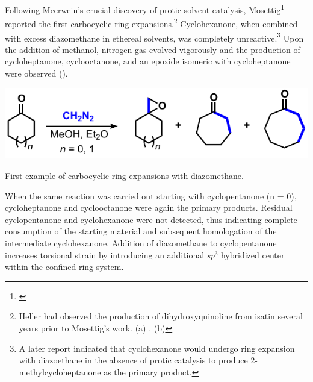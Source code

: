 Following Meerwein's crucial discovery of protic solvent catalysis,
Mosettig\footnote{ \label{ref:mosettig}} reported the first carbocyclic ring expansions.\footnote{Heller had observed the production of dihydroxyquinoline
from isatin several years prior to Mosettig's work. (a) . (b)
} Cyclohexanone, when combined with excess
diazomethane in ethereal solvents, was completely unreactive.\footnote{A later
report indicated that cyclohexanone would undergo ring expansion with
diazoethane in the absence of protic catalysis to produce 2-methylcycloheptanone
as the primary product. } Upon the addition of methanol, nitrogen
gas evolved vigorously and the production of cycloheptanone, cyclooctanone, and an epoxide
isomeric with cycloheptanone were observed ().
\begin{Scheme}[b]
  \centering
  \includegraphics[scale=0.8]{chp_diazobkg/images/mosettig}
  \caption{First example of carbocyclic ring expansions with diazomethane.}
  \label{sch:mosettig}
\end{Scheme}
When the same reaction was carried out starting with cyclopentanone (n = 0),
cycloheptanone and cyclooctanone were again the primary products. Residual cyclopentanone and cyclohexanone were not detected, thus indicating
complete consumption of the starting material and subsequent homologation of the
intermediate cyclohexanone. Addition of diazomethane to cyclopentanone increases torsional strain by
introducing an additional \textit{sp$^3$} hybridized center within the confined ring system. 
